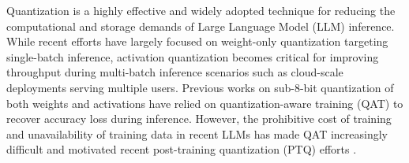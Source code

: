 Quantization is a highly effective and widely adopted technique for reducing the computational and storage demands of Large Language Model (LLM) inference. While recent efforts \citep{wang2023bitnet,tseng2024quipbetterllmquantization,egiazarian2024aqlm,frantar2023optq,lin2023awq} have largely focused on weight-only quantization targeting single-batch inference, activation quantization becomes critical for improving throughput during multi-batch inference scenarios such as cloud-scale deployments serving multiple users. Previous works \citep{yao2023zeroquantv2,dai2021vsq} on sub-8-bit quantization of both weights and activations have relied on quantization-aware training (QAT) to recover accuracy loss during inference. However, the prohibitive cost of training and unavailability of training data in recent LLMs has made QAT increasingly difficult and motivated recent post-training quantization (PTQ) efforts \citep{xiao2023smoothquant,rouhani2023microscaling,wu2023zeroquantfp}. 



